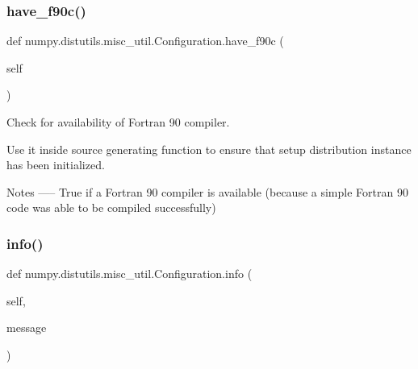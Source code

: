 \subsubsection{\texorpdfstring{have\+\_\+f90c()}{have\_f90c()}}
{\footnotesize\ttfamily def numpy.\+distutils.\+misc\+\_\+util.\+Configuration.\+have\+\_\+f90c (\begin{DoxyParamCaption}\item[{}]{self }\end{DoxyParamCaption})}

\begin{DoxyVerb}Check for availability of Fortran 90 compiler.

Use it inside source generating function to ensure that
setup distribution instance has been initialized.

Notes
-----
True if a Fortran 90 compiler is available (because a simple Fortran
90 code was able to be compiled successfully)
\end{DoxyVerb}
 \mbox{\label{classnumpy_1_1distutils_1_1misc__util_1_1Configuration_a34d7a120320999f56bd8b54736e86fa7}} 
\subsubsection{\texorpdfstring{info()}{info()}}
{\footnotesize\ttfamily def numpy.\+distutils.\+misc\+\_\+util.\+Configuration.\+info (\begin{DoxyParamCaption}\item[{}]{self,  }\item[{}]{message }\end{DoxyParamCaption})}

\mbox{\label{classnumpy_1_1distutils_1_1misc__util_1_1Configuration_a847288ee91ad8fe53d12bdf25a29ed32}} 
